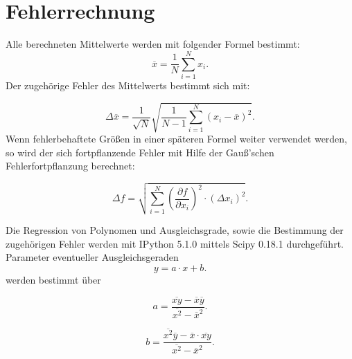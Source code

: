 \section{Fehlerrechnung}
\label{sec:fehlerrechnung}
Alle berechneten Mittelwerte werden mit folgender Formel bestimmt:
\begin{equation}
  \label{eqn:mittelwert}
  \overline x=\frac{1}{N}\sum \limits_{i=1}^{N} x_i .
\end{equation}
Der zugehörige Fehler des Mittelwerts bestimmt sich mit:

\begin{equation}
  \label{eqn:mittelwertfehler}
  \Delta \overline x= \frac{1}{\sqrt{N}} \sqrt{\frac{1}{N-1} \sum \limits_{i=1}^{N} (x_i- \overline x)^2}.
\end {equation}
Wenn fehlerbehaftete Größen in einer späteren Formel weiter verwendet werden, so wird der sich fortpflanzende Fehler
mit Hilfe der Gauß’schen Fehlerfortpflanzung berechnet:

\begin{equation}
  \label{eqn.fehlerfortpflanzung}
  \Delta f = \sqrt{ \sum \limits_{i = 1}^{N} (\frac{\partial f}{\partial x_i})^2 \cdot (\Delta x_i)^2}.
\end{equation}

Die Regression von Polynomen und Ausgleichsgrade, sowie die Bestimmung der zugehörigen Fehler werden mit
IPython 5.1.0 mittels Scipy 0.18.1 durchgeführt.
Parameter eventueller Ausgleichsgeraden
\begin{equation}
\label{eqn:ausgleichsgrade}
y=a \cdot x +b .
\end{equation}
werden bestimmt über

\begin{equation}
\label{eqn:ausgleichsgrade_a}
a= \frac{ \overline{xy}- \overline{x} \overline{y}}{\overline{x^2}-\overline{x}^2} .
\end{equation}

\begin{equation}
\label{eqn:ausgleichsgrade_b}
b= \frac{ \overline{x^2} \overline{y}- \overline{x} \cdot \overline{xy}}{\overline{x^2}-\overline{x}^2} .
\end{equation}

